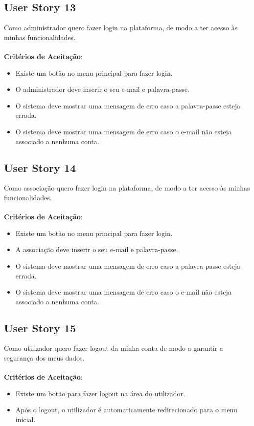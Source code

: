 \documentclass[a4paper,11pt]{article}
\begin{document}
\subsection*{User Story 13}
Como administrador quero fazer login na plataforma, de modo a ter acesso às minhas funcionalidades.\\\\
\textbf{Critérios de Aceitação}:
\begin{itemize}
  \item Existe um botão no menu principal para fazer login.
  \item O administrador deve inserir o seu e-mail e palavra-passe.
  \item O sistema deve mostrar uma mensagem de erro caso a palavra-passe esteja errada.
  \item O sistema deve mostrar uma mensagem de erro caso o e-mail não esteja associado a nenhuma conta.
\end{itemize}

\subsection*{User Story 14}
Como associação quero fazer login na plataforma, de modo a ter acesso às minhas funcionalidades.\\\\
\textbf{Critérios de Aceitação}:
\begin{itemize}
  \item Existe um botão no menu principal para fazer login.
  \item A associação deve inserir o seu e-mail e palavra-passe.
  \item O sistema deve mostrar uma mensagem de erro caso a palavra-passe esteja errada.
  \item O sistema deve mostrar uma mensagem de erro caso o e-mail não esteja associado a nenhuma conta.
\end{itemize}

\subsection*{User Story 15}
Como utilizador quero fazer logout da minha conta de modo a garantir a segurança dos meus dados.\\\\
\textbf{Critérios de Aceitação}:
\begin{itemize}
  \item Existe um botão para fazer logout na área do utilizador.
  \item Após o logout, o utilizador é automaticamente redirecionado para o menu inicial.
\end{itemize}
\end{document}
